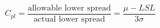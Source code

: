 

\[
C_{pl} = \frac{\mbox{allowable lower spread}} {\mbox{actual lower spread}} = \frac{\mu - LSL} {3\sigma}
\]



